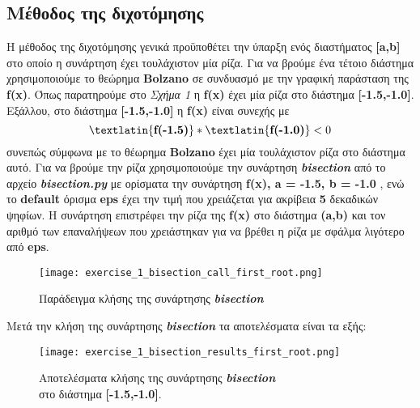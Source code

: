 \documentclass[First Project.tex]{subfiles}
\begin{document}
\subsection{ Μέθοδος της διχοτόμησης }
Η μέθοδος της διχοτόμησης γενικά προϋποθέτει την ύπαρξη ενός διαστήματος \textlatin{\textbf{[a,b]}} στο οποίο η συνάρτηση έχει τουλάχιστον μία ρίζα. Για να βρούμε ένα 
τέτοιο διάστημα χρησιμοποιούμε το θεώρημα \textlatin{\textbf{Bolzano}} σε συνδυασμό με την γραφική παράσταση της \textlatin{\textbf{f(x)}}. Όπως 
παρατηρούμε στο \textit{Σχήμα 1} η \textlatin{\textbf{f(x)}} έχει μία ρίζα στο διάστημα \textlatin{\textbf{[-1.5,-1.0]}}. Εξάλλου, στο διάστημα 
\textlatin{\textbf{[-1.5,-1.0]}} η \textlatin{\textbf{f(x)}} είναι συνεχής με \[\textlatin{\textbf{f(-1.5)}}*\textlatin{\textbf{f(-1.0)}}<0\] 
συνεπώς σύμφωνα με το θέωρημα \textlatin{\textbf{Bolzano}} έχει μία τουλάχιστον ρίζα στο διάστημα αυτό. Για να βρούμε την ρίζα χρησιμοποιούμε
την συνάρτηση \textit{\textlatin{\textbf{bisection}}} από το αρχείο \textit{\textlatin{\textbf{bisection.py}}} με ορίσματα την συνάρτηση 
\textlatin{\textbf{f(x), a = -1.5, b = -1.0 }}, ενώ το \textlatin{\textbf{default}} όρισμα \textlatin{\textbf{eps}} έχει την τιμή που
χρειάζεται για ακρίβεια \textbf{5} δεκαδικών ψηφίων. H συνάρτηση επιστρέφει την ρίζα της \textlatin{\textbf{f(x)}} στο διάστημα 
\textlatin{\textbf{(a,b)}} και τον αριθμό των επαναλήψεων που χρειάστηκαν για να βρέθει η ρίζα με σφάλμα λιγότερο από \textlatin{\textbf{eps}}.
\vspace{5px}
\begin{figure}[hp]
    \centering
    \captionsetup{justification=centering}
    \begin{center}
        \texttt{[image: exercise\_1\_bisection\_call\_first\_root.png]}    
        \caption{Παράδειγμα κλήσης της συνάρτησης \textit{\textlatin{\textbf{bisection}}}}
    \end{center}
\end{figure}

Μετά την κλήση της συνάρτησης \textit{\textlatin{\textbf{bisection}}} τα αποτελέσματα είναι τα εξής:
\vspace{5px}
\begin{figure}[hp]
    \centering
    \captionsetup{justification=centering}
    \begin{center}
    \texttt{[image: exercise\_1\_bisection\_results\_first\_root.png]}    
    \caption{ Αποτελέσματα κλήσης της συνάρτησης \textit{\textlatin{\textbf{bisection}}} \\ στο διάστημα \textlatin{\textbf{[-1.5,-1.0]}}. }
    \end{center}
\end{figure}
\end{document}
